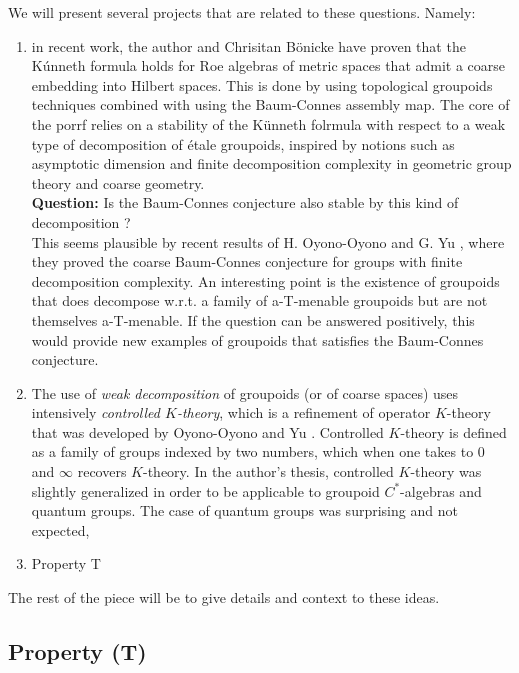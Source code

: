 We will present several projects that are related to these questions. Namely:
\begin{enumerate}
\item in recent work, the author and Chrisitan B\"onicke have proven that the K\'unneth formula holds for Roe algebras of metric spaces that admit a coarse embedding into Hilbert spaces. This is done by using topological groupoids techniques combined with using the Baum-Connes assembly map. The core of the porrf relies on a stability of the K\"unneth folrmula with respect to a weak type of decomposition of \'etale groupoids, inspired by notions such as asymptotic dimension and finite decomposition complexity in geometric group theory and coarse geometry. \\

\textbf{Question:} Is the Baum-Connes conjecture also stable by this kind of decomposition ?\\

This seems plausible by recent results of H. Oyono-Oyono and G. Yu \cite{OY3}, where they proved the coarse Baum-Connes conjecture for groups with finite decomposition complexity. An interesting point is the existence of groupoids that does decompose w.r.t. a family of a-T-menable groupoids but are not themselves a-T-menable. If the question can be answered positively, this would provide new examples of groupoids that satisfies the Baum-Connes conjecture.     

\item The use of \textit{weak decomposition} of groupoids (or of coarse spaces) uses intensively \textit{controlled $K$-theory}, which is a refinement of operator $K$-theory that was developed by Oyono-Oyono and Yu \cite{OY2}. Controlled $K$-theory is defined as a family of groups indexed by two numbers, which when one takes to $0$ and $\infty$ recovers $K$-theory. In the author's thesis, controlled $K$-theory was slightly generalized in order to be applicable to groupoid $C^*$-algebras and quantum groups. The case of quantum groups was surprising and not expected,  

\item Property T
 
\end{enumerate}

The rest of the piece will be to give details and context to these ideas.

\subsection{Property (T)}


